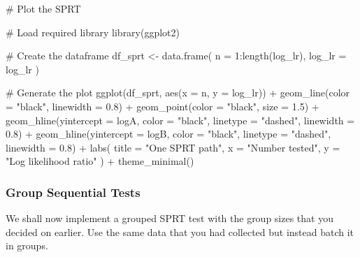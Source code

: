 \documentclass[
  letterpaper,
  DIV=11,
  numbers=noendperiod]{scrartcl}
\newenvironment{Shaded}{\begin{snugshade}}{\end{snugshade}}
\newcommand{\AttributeTok}[1]{\textcolor[rgb]{0.40,0.45,0.13}{#1}}
\newcommand{\CommentTok}[1]{\textcolor[rgb]{0.37,0.37,0.37}{#1}}
\newcommand{\DecValTok}[1]{\textcolor[rgb]{0.68,0.00,0.00}{#1}}
\newcommand{\FloatTok}[1]{\textcolor[rgb]{0.68,0.00,0.00}{#1}}
\newcommand{\FunctionTok}[1]{\textcolor[rgb]{0.28,0.35,0.67}{#1}}
\newcommand{\NormalTok}[1]{\textcolor[rgb]{0.00,0.23,0.31}{#1}}
\newcommand{\OtherTok}[1]{\textcolor[rgb]{0.00,0.23,0.31}{#1}}
\newcommand{\SpecialCharTok}[1]{\textcolor[rgb]{0.37,0.37,0.37}{#1}}
\newcommand{\StringTok}[1]{\textcolor[rgb]{0.13,0.47,0.30}{#1}}
\begin{document}
\begin{Shaded}
\begin{Highlighting}[]
\CommentTok{\# Plot the SPRT}

\CommentTok{\# Load required library}
\FunctionTok{library}\NormalTok{(ggplot2)}

\CommentTok{\# Create the dataframe }
\NormalTok{df\_sprt }\OtherTok{\textless{}{-}} \FunctionTok{data.frame}\NormalTok{(}
  \AttributeTok{n =} \DecValTok{1}\SpecialCharTok{:}\FunctionTok{length}\NormalTok{(log\_lr),}
  \AttributeTok{log\_lr =}\NormalTok{ log\_lr}
\NormalTok{)}

\CommentTok{\# Generate the plot}
\FunctionTok{ggplot}\NormalTok{(df\_sprt, }\FunctionTok{aes}\NormalTok{(}\AttributeTok{x =}\NormalTok{ n, }\AttributeTok{y =}\NormalTok{ log\_lr)) }\SpecialCharTok{+}
  \FunctionTok{geom\_line}\NormalTok{(}\AttributeTok{color =} \StringTok{"black"}\NormalTok{, }\AttributeTok{linewidth =} \FloatTok{0.8}\NormalTok{) }\SpecialCharTok{+}
  \FunctionTok{geom\_point}\NormalTok{(}\AttributeTok{color =} \StringTok{"black"}\NormalTok{, }\AttributeTok{size =} \FloatTok{1.5}\NormalTok{) }\SpecialCharTok{+}
  \FunctionTok{geom\_hline}\NormalTok{(}\AttributeTok{yintercept =}\NormalTok{ logA, }\AttributeTok{color =} \StringTok{"black"}\NormalTok{, }\AttributeTok{linetype =} \StringTok{"dashed"}\NormalTok{, }\AttributeTok{linewidth =} \FloatTok{0.8}\NormalTok{) }\SpecialCharTok{+}
  \FunctionTok{geom\_hline}\NormalTok{(}\AttributeTok{yintercept =}\NormalTok{ logB, }\AttributeTok{color =} \StringTok{"black"}\NormalTok{, }\AttributeTok{linetype =} \StringTok{"dashed"}\NormalTok{, }\AttributeTok{linewidth =} \FloatTok{0.8}\NormalTok{) }\SpecialCharTok{+}
  \FunctionTok{labs}\NormalTok{(}
    \AttributeTok{title =} \StringTok{"One SPRT path"}\NormalTok{,}
    \AttributeTok{x =} \StringTok{"Number tested"}\NormalTok{,}
    \AttributeTok{y =} \StringTok{"Log likelihood ratio"}
\NormalTok{  ) }\SpecialCharTok{+}
  \FunctionTok{theme\_minimal}\NormalTok{()}
\end{Highlighting}
\end{Shaded}

\subsubsection{Group Sequential Tests}\label{group-sequential-tests}

We shall now implement a grouped SPRT test with the group sizes that you
decided on earlier. Use the same data that you had collected but instead
batch it in groups.
\end{document}
